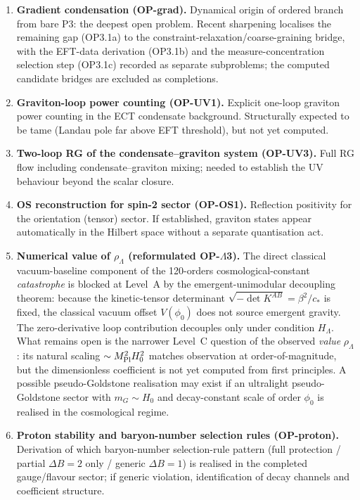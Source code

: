 \documentclass[11pt,a4paper]{article}
\begin{document}
\begin{enumerate}
\item \textbf{Gradient condensation (OP-grad).} Dynamical origin of ordered branch from bare P3: the deepest open problem. Recent sharpening localises the remaining gap (OP3.1a) to the constraint-relaxation/coarse-graining bridge, with the EFT-data derivation (OP3.1b) and the measure-concentration selection step (OP3.1c) recorded as separate subproblems; the computed candidate bridges are excluded as completions.

\item \textbf{Graviton-loop power counting (OP-UV1).} Explicit one-loop graviton power counting in the ECT condensate background. Structurally expected to be tame (Landau pole far above EFT threshold), but not yet computed.

\item \textbf{Two-loop RG of the condensate--graviton system (OP-UV3).} Full RG flow including condensate--graviton mixing; needed to establish the UV behaviour beyond the scalar closure.

\item \textbf{OS reconstruction for spin-2 sector (OP-OS1).} Reflection positivity for the orientation (tensor) sector. If established, graviton states appear automatically in the Hilbert space without a separate quantisation act.

\item \textbf{Numerical value of $\rho_\Lambda$ (reformulated OP-$\Lambda$3).} The direct classical vacuum-baseline component of the 120-orders cosmological-constant \emph{catastrophe} is blocked at Level~A by the emergent-unimodular decoupling theorem: because the kinetic-tensor determinant $\sqrt{-\det K^{AB}}=\beta^2/c_*$ is fixed, the classical vacuum offset $V(\phi_0)$ does not source emergent gravity. The zero-derivative loop contribution decouples only under condition $H_\Lambda$. What remains open is the narrower Level~C question of the observed \emph{value} $\rho_\Lambda$: its natural scaling $\sim M_{\rm Pl}^2 H_0^2$ matches observation at order-of-magnitude, but the dimensionless coefficient is not yet computed from first principles. A possible pseudo-Goldstone realisation may exist if an ultralight pseudo-Goldstone sector with $m_G\sim H_0$ and decay-constant scale of order $\phi_0$ is realised in the cosmological regime.

\item \textbf{Proton stability and baryon-number selection rules (OP-proton).} Derivation of which baryon-number selection-rule pattern (full protection / partial $\Delta B\!=\!2$ only / generic $\Delta B\!=\!1$) is realised in the completed gauge/flavour sector; if generic violation, identification of decay channels and coefficient structure.


\end{enumerate}
\end{document}
